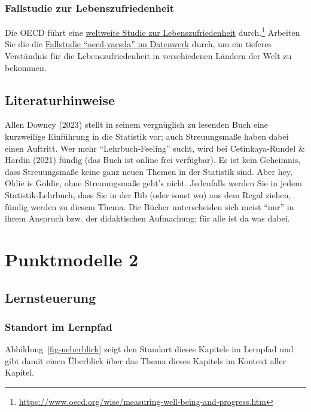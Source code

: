 \documentclass[
  letterpaper,
]{scrbook}
\theoremstyle{definition}
\theoremstyle{definition}
\theoremstyle{definition}
\theoremstyle{remark}
\begin{document}
\subsection{Fallstudie zur
Lebenszufriedenheit}\label{fallstudie-zur-lebenszufriedenheit}

Die OECD führt eine
\href{https://www.oecd.org/wise/measuring-well-being-and-progress.htm}{weltweite
Studie zur Lebenszufriedenheit} durch.\footnote{\url{https://www.oecd.org/wise/measuring-well-being-and-progress.htm}}
Arbeiten Sie die die
\href{https://datenwerk.netlify.app/posts/oecd-yacsda/}{Fallstudie
``oecd-yacsda'' im Datenwerk} durch, um ein tieferes Verständnis für die
Lebenszufriedenheit in verschiedenen Ländern der Welt zu bekommen.

\section{Literaturhinweise}\label{literaturhinweise-5}

Allen Downey (2023) stellt in seinem vergnüglich zu lesenden Buch eine
kurzweilige Einführung in die Statistik vor; auch Streuungsmaße haben
dabei einen Auftritt. Wer mehr ``Lehrbuch-Feeling'' sucht, wird bei
Cetinkaya-Rundel \& Hardin (2021) fündig (das Buch ist online frei
verfügbar). Es ist kein Geheimnis, dass Streuungsmaße keine ganz neuen
Themen in der Statistik sind. Aber hey, Oldie is Goldie, ohne
Streuungsmaße geht's nicht. Jedenfalls werden Sie in jedem
Statistik-Lehrbuch, dass Sie in der Bib (oder sonst wo) aus dem Regal
ziehen, fündig werden zu diesem Thema. Die Bücher unterscheiden sich
meist ``nur'' in ihrem Anspruch bzw. der didaktischen Aufmachung; für
alle ist da was dabei.

\chapter{Punktmodelle 2}\label{sec-zusammenhaenge}

\section{Lernsteuerung}\label{lernsteuerung-6}

\subsection{Standort im Lernpfad}\label{standort-im-lernpfad}

Abbildung~\ref{fig-ueberblick} zeigt den Standort dieses Kapitels im
Lernpfad und gibt damit einen Überblick über das Thema dieses Kapitels
im Kontext aller Kapitel.
\end{document}
